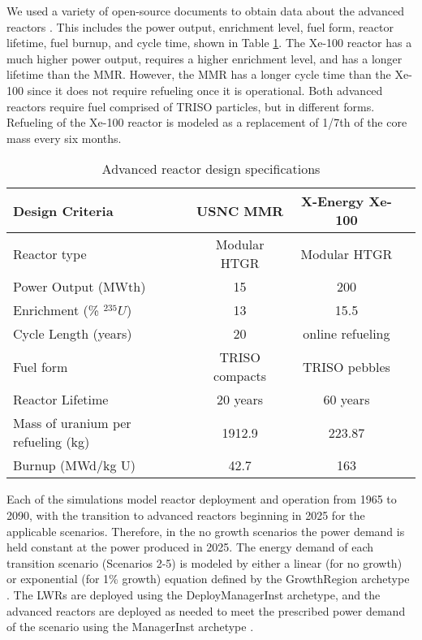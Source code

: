 We used a variety of open-source documents to obtain data about the advanced reactors
\cite{mitchell_usnc_2020, harlan_x-energy_2018, hussain_advances_2018}. 
This includes 
the power output, enrichment level, fuel form, reactor lifetime, fuel 
burnup, and cycle time, shown in Table \ref{tab:reactor_summary}. 
The Xe-100 reactor has a much higher power output, requires a higher enrichment 
level, and has a longer lifetime than the \gls{MMR}. However, the 
\gls{MMR} has a longer cycle time than the Xe-100 since it does not require 
refueling once it is operational. Both advanced reactors require fuel 
comprised of \gls{TRISO} particles, but in different forms. Refueling 
of the Xe-100 reactor is modeled as a replacement of 1/7th of the core mass 
every six months. 

\begin{table}[ht]
        \caption{Advanced reactor design specifications}
        \label{tab:reactor_summary}
        \begin{tabular}{l c c c}
            \hline
            Design Criteria & \gls{USNC} \gls{MMR} \cite{mitchell_usnc_2020}& 
                X-Energy Xe-100 \cite{harlan_x-energy_2018,hussain_advances_2018} \\\hline
            Reactor type & Modular HTGR & Modular HTGR \\
            Power Output (MWth) & 15 & 200 \\
            Enrichment (\% $^{235}U$) & 13 & 15.5 \\
            Cycle Length (years) & 20 & online refueling\\
            Fuel form & \gls{TRISO} compacts & \gls{TRISO} pebbles\\
            Reactor Lifetime & 20 years & 60 years \\
            Mass of uranium per refueling (kg) & 1912.9 & 223.87 \\
            Burnup (MWd/kg U) & 42.7 & 163 \\
            \hline
        \end{tabular}
    \end{table}

Each of the simulations model reactor deployment and operation from 1965 to 
2090, with the transition to advanced reactors beginning 
in 2025 for the applicable scenarios. Therefore, in the no growth scenarios 
the power demand is held constant 
at the power produced in 2025. The energy demand of each transition scenario 
(Scenarios 2-5) is modeled by either a linear (for no growth) or 
exponential (for 1\% growth) equation defined by the \Cycamore GrowthRegion
archetype \cite{huff_fundamental_2016}. The \glspl{LWR} are deployed 
using the \Cycamore DeployManagerInst archetype, and the 
advanced reactors are deployed as needed to meet the prescribed power demand 
of the scenario using the \Cycamore ManagerInst archetype 
\cite{huff_fundamental_2016}.

